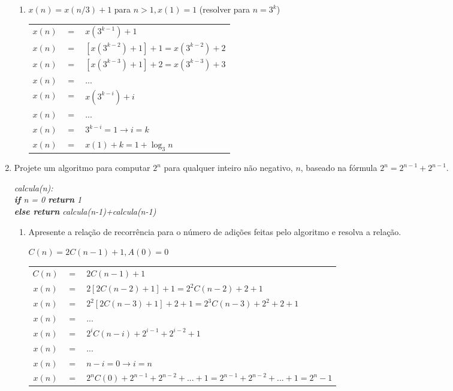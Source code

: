\documentclass[12pt,a4paper]{article}
\begin{document}
\begin{enumerate}
\begin{enumerate}
		\item $x(n) = x(n/3)+1$ para $n>1, x(1)=1$ (resolver para $n=3^k$)
		
		\begin{table}[H]
			\centering
			\begin{tabular}{ccl}
				$x(n)$ & $=$ & $x(3^{k-1})+1$\\
				$x(n)$ & $=$ & $[x(3^{k-2})+1]+1 = x(3^{k-2})+2$\\
				$x(n)$ & $=$ & $[x(3^{k-3})+1]+2 = x(3^{k-3})+3$\\
				$x(n)$ & $=$ & ...\\
				$x(n)$ & $=$ & $x(3^{k-i})+i$\\
				$x(n)$ & $=$ & ...\\
				$x(n)$ & $=$ & $3^{k-i}=1 \rightarrow i=k$\\
				$x(n)$ & $=$ & $x(1)+k = 1 + \log_3 n$\\
			\end{tabular}
		\end{table}		
	\end{enumerate}

	\item Projete um algoritmo para computar $2^n$ para qualquer inteiro não negativo, $n$, baseado na fórmula $2^n = 2^{n-1} + 2^{n-1}$.
	
	\textit{calcula(n):\\
	\textbf{if} n = 0 \textbf{return} 1\\
	\textbf{else return} calcula(n-1)+calcula(n-1)}
	
	\begin{enumerate}
		\item Apresente a relação de recorrência para o número de adições feitas pelo algoritmo e resolva	a relação.
		
		$C(n) = 2C(n-1)+1, A(0)=0$
		
		\begin{table}[H]
			\centering
			\begin{tabular}{ccl}
				$C(n)$ & $=$ & $2C(n-1)+1$\\
				$x(n)$ & $=$ & $2[2C(n-2)+1]+1=2^2C(n-2)+2+1$\\
				$x(n)$ & $=$ & $2^2[2C(n-3)+1]+2+1 = 2^3C(n-3)+2^2+2+1$\\
				$x(n)$ & $=$ & ...\\
				$x(n)$ & $=$ & $2^iC(n-i)+2^{i-1}+2^{i-2}+1$\\
				$x(n)$ & $=$ & ...\\
				$x(n)$ & $=$ & $n-i=0 \rightarrow i=n$\\
				$x(n)$ & $=$ & $2^nC(0)+2^{n-1}+2^{n-2}+...+1= 2^{n-1}+2^{n-2}+...+1=2^n-1$\\
			\end{tabular}
		\end{table}		
		

\end{enumerate}
\end{enumerate}
\end{document}
